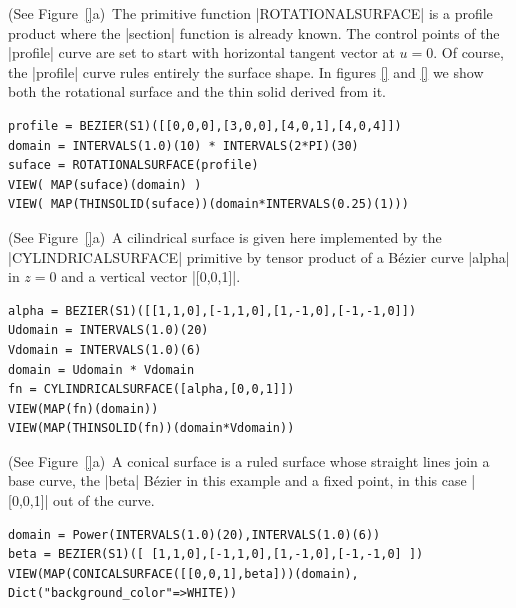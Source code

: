 \begin{coding}[Algebraic computation of FE = $\delta_1$]
\begin{condition} (See Figure~\ref{}a)\
The primitive function |ROTATIONALSURFACE| is a profile product where the |section| function is already known. The control points of the |profile| curve are set to start with horizontal tangent vector at $u=0$. Of course, the |profile| curve rules entirely the surface shape. In figures \ref{} and \ref{} we show both the rotational surface and the thin solid derived from it.
\begin{lstlisting}[language=JuliaLocal, style=julia, mathescape=true]
profile = BEZIER(S1)([[0,0,0],[3,0,0],[4,0,1],[4,0,4]]) 
domain = INTERVALS(1.0)(10) * INTERVALS(2*PI)(30)
suface = ROTATIONALSURFACE(profile)
VIEW( MAP(suface)(domain) )
VIEW( MAP(THINSOLID(suface))(domain*INTERVALS(0.25)(1))) 
\end{lstlisting}
\end{condition}

\begin{condition}[(Cylindrical surface and solid] (See Figure~\ref{}a)\
A cilindrical surface is given here implemented by the |CYLINDRICALSURFACE| primitive by tensor product of a Bézier curve |alpha| in $z=0$ and a vertical vector |[0,0,1]|. 
\begin{lstlisting}[language=JuliaLocal, style=julia, mathescape=true]
alpha = BEZIER(S1)([[1,1,0],[-1,1,0],[1,-1,0],[-1,-1,0]])
Udomain = INTERVALS(1.0)(20)
Vdomain = INTERVALS(1.0)(6)
domain = Udomain * Vdomain
fn = CYLINDRICALSURFACE([alpha,[0,0,1]])
VIEW(MAP(fn)(domain))
VIEW(MAP(THINSOLID(fn))(domain*Vdomain))
\end{lstlisting}
\end{condition}

\begin{condition} (See Figure~\ref{}a)\
A conical surface is a ruled surface whose straight lines join a base curve, the |beta| Bézier in this example and a fixed point, in this case |[0,0,1]| out of the curve.
\begin{lstlisting}[language=JuliaLocal, style=julia, mathescape=true]
domain = Power(INTERVALS(1.0)(20),INTERVALS(1.0)(6))
beta = BEZIER(S1)([ [1,1,0],[-1,1,0],[1,-1,0],[-1,-1,0] ])
VIEW(MAP(CONICALSURFACE([[0,0,1],beta]))(domain), Dict("background_color"=>WHITE))
\end{lstlisting}
\end{condition}


\end{coding}
